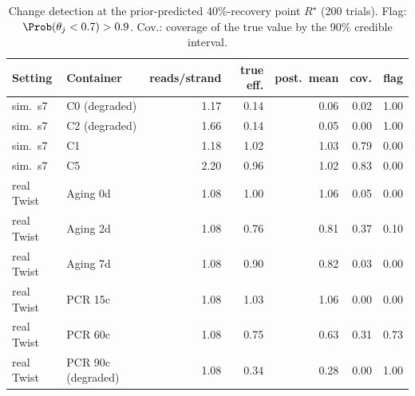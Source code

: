 \begin{table}[!t]
\centering
\caption{Change detection at the prior-predicted 40\%-recovery point $R^\star$ (200 trials). Flag: $\Prob(\theta_j<0.7)>0.9$.
Cov.: coverage of the true value by the 90\% credible interval.}
\label{tab:detect}
\scriptsize
\setlength{\tabcolsep}{3pt}
\begin{tabular}{@{}llrrrrr@{}}
\toprule
Setting & Container & reads/strand & true eff. & post.\ mean & cov. & flag \\
\midrule
sim.\ s7 & C0 (degraded) & 1.17 & 0.14 & 0.06 & 0.02 & 1.00 \\
sim.\ s7 & C2 (degraded) & 1.66 & 0.14 & 0.05 & 0.00 & 1.00 \\
sim.\ s7 & C1 & 1.18 & 1.02 & 1.03 & 0.79 & 0.00 \\
sim.\ s7 & C5 & 2.20 & 0.96 & 1.02 & 0.83 & 0.00 \\
real Twist & Aging 0d & 1.08 & 1.00 & 1.06 & 0.05 & 0.00 \\
real Twist & Aging 2d & 1.08 & 0.76 & 0.81 & 0.37 & 0.10 \\
real Twist & Aging 7d & 1.08 & 0.90 & 0.82 & 0.03 & 0.00 \\
real Twist & PCR 15c & 1.08 & 1.03 & 1.06 & 0.00 & 0.00 \\
real Twist & PCR 60c & 1.08 & 0.75 & 0.63 & 0.31 & 0.73 \\
real Twist & PCR 90c (degraded) & 1.08 & 0.34 & 0.28 & 0.00 & 1.00 \\
\bottomrule
\end{tabular}
\end{table}
